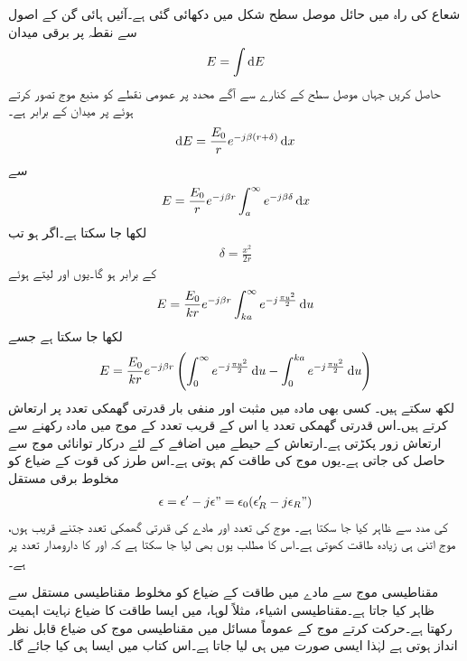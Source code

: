 شعاع کی راہ میں حائل موصل سطح شکل میں دکھائی گئی ہے۔آئیں ہائی گن کے اصول سے نقطہ  پر برقی میدان 
\begin{align}
E=\int \dif E
\end{align}
حاصل کریں جہاں موصل سطح کے کنارے سے آگے  محدد پر عمومی نقطے کو منبع موج تصور کرتے ہوئے  پر میدان  کے برابر ہے۔
\begin{align}
\dif E=\frac{E_0}{r} e^{-j \beta (r+\delta)} \dif x
\end{align}
سے
\begin{align}
E=\frac{E_0}{r} e^{-j \beta r} \int_a^{\infty} e^{-j \beta \delta} \dif x
\end{align}
لکھا جا سکتا ہے۔اگر  ہو تب
\begin{align}
\delta=\frac{x^2}{2r}
\end{align}
کے برابر ہو گا۔یوں  اور  لیتے ہوئے
\begin{align}
E=\frac{E_0}{k r} e^{-j \beta r} \int_{k a}^{\infty} e^{-j \frac{\pi u^2}{2}} \dif u
\end{align}
لکھا جا سکتا ہے جسے
\begin{align}
E=\frac{E_0}{k r} e^{-j \beta r} \left(\int_0^{\infty} e^{-j \frac{\pi u^2}{2}} \dif u-\int_0^{k a} e^{-j \frac{\pi u^2}{2}} \dif u \right)
\end{align}
لکھ سکتے ہیں۔
کسی بھی مادہ میں مثبت اور منفی بار قدرتی گھمکی تعدد پر ارتعاش کرتے ہیں۔اس قدرتی گھمکی تعدد یا اس کے قریب تعدد کے موج میں مادہ رکھنے سے ارتعاش زور پکڑتی ہے۔ارتعاش کے حیطے میں اضافے کے لئے درکار توانائی موج سے حاصل کی جاتی ہے۔یوں موج کی طاقت کم ہوتی ہے۔اس طرز کی قوت کے ضیاع کو مخلوط برقی مستقل
\begin{align}
\epsilon=\epsilon'-j \epsilon"=\epsilon_0(\epsilon_R'-j\epsilon_R")
\end{align}
 کی مدد سے ظاہر کیا جا سکتا ہے۔ موج کی تعدد اور مادے کی قدرتی گھمکی تعدد جتنے قریب ہوں، موج اتنی ہی زیادہ طاقت کھوتی ہے۔اس کا مطلب یوں بھی لیا جا سکتا ہے کہ  اور  کا دارومدار تعدد پر ہے۔

مقناطیسی موج سے مادے میں طاقت کے ضیاع کو مخلوط مقناطیسی مستقل  سے ظاہر کیا جاتا ہے۔مقناطیسی اشیاء، مثلاً لوہا، میں ایسا طاقت کا ضیاع نہایت اہمیت رکھتا ہے۔حرکت کرتے موج کے عموماً مسائل میں مقناطیسی موج کی ضیاع قابل نظر انداز ہوتی ہے لہٰذا ایسی صورت میں  ہی لیا جاتا ہے۔اس کتاب میں ایسا ہی کیا جائے گا۔

